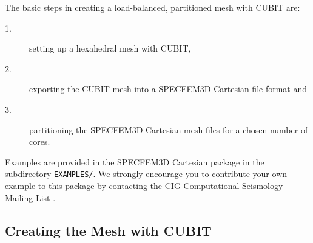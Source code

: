 \noindent
The basic steps in creating a load-balanced, partitioned mesh with
CUBIT are:
\begin{description}
\item [{1.}] setting up a hexahedral mesh with CUBIT,
\item [{2.}] exporting the CUBIT mesh into a SPECFEM3D Cartesian file format
and
\item [{3.}] partitioning the SPECFEM3D Cartesian mesh files for a chosen
number of cores.
\end{description}
Examples are provided in the SPECFEM3D Cartesian package in the subdirectory
\texttt{EXAMPLES/}. We strongly encourage you to contribute your own
example to this package by contacting the CIG Computational Seismology
Mailing List .


\subsection{Creating the Mesh with CUBIT}

